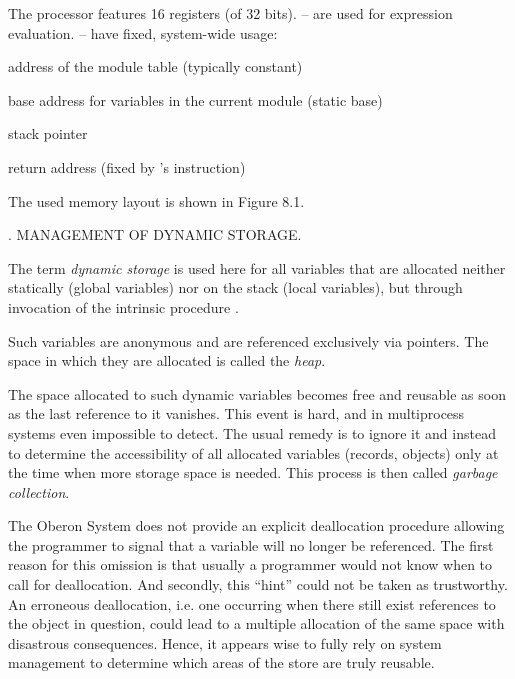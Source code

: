 The \RISC processor features 16 registers (of 32 bits). -- are used for expression evaluation. -- have fixed, system-wide usage:
{\narrower
\item{} address of the module table  (typically constant)
\item{} base address for variables in the current module  (static base)
\item{} stack pointer 
\item{} return address  (fixed by \RISC's  instruction)

}
\smallskip\noindent The used memory layout is shown in Figure 8.1.


. MANAGEMENT OF DYNAMIC STORAGE.

The term \emph{dynamic storage} is used here for all variables that are allocated neither statically (global variables) nor on the stack (local variables), but through invocation of the intrinsic procedure .

Such variables are anonymous and are referenced exclusively via pointers. The space in which they are allocated is called the \emph{heap}.

The space allocated to such dynamic variables becomes free and reusable as soon as the last reference to it vanishes. This event is hard, and in multiprocess systems even impossible to detect. The usual remedy is to ignore it and instead to determine the accessibility of all allocated variables (records, objects) only at the time when more storage space is needed. This process is then called \emph{garbage collection}.

The Oberon System does not provide an explicit deallocation procedure allowing the programmer to signal that a variable will no longer be referenced. The first reason for this omission is that usually a programmer would not know when to call for deallocation. And secondly, this ``hint'' could not be taken as trustworthy. An erroneous deallocation, i.e. one occurring when there still exist references to the object in question, could lead to a multiple allocation of the same space with disastrous consequences. Hence, it appears wise to fully rely on system management to determine which areas of the store are truly reusable.

